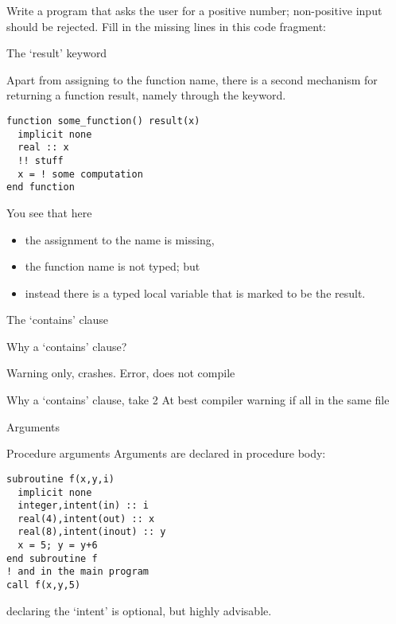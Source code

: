 \begin{exercise}
  \label{ex:freadpos}
  Write a program that asks the user for a positive number;
  non-positive
  input should be rejected.  Fill in the missing lines in this code
  fragment:
\end{exercise}

 {The `result' keyword}
\label{sec:fresult}

Apart from assigning to the function name,
there is a second mechanism for returning a function result,
namely through the  keyword.
%
\begin{lstlisting}
function some_function() result(x)
  implicit none
  real :: x
  !! stuff
  x = ! some computation
end function
\end{lstlisting}

You see that here
\begin{itemize}
\item the assignment to the name is missing,
\item the function name is not typed; but
\item instead there is a typed local variable that is marked to be the result.
\end{itemize}

 {The `contains' clause}

\begin{block}{Why a `contains' clause?}
  \label{sl:whycontain}
  \begin{multicols}{2}
    Warning only, crashes.
    \vfill\columnbreak
    Error, does not compile
  \end{multicols}
\end{block}

\begin{block}{Why a `contains' clause, take 2}
  \label{sl:whycontain_type}
  At best compiler warning if all in the same file\\
\end{block}

 {Arguments}

\begin{block}{Procedure arguments}
  \label{sl:farguments}
 Arguments are declared in procedure body:
\begin{lstlisting}
subroutine f(x,y,i)
  implicit none
  integer,intent(in) :: i
  real(4),intent(out) :: x
  real(8),intent(inout) :: y
  x = 5; y = y+6
end subroutine f
! and in the main program
call f(x,y,5)
\end{lstlisting}
declaring the `intent' is optional, but highly advisable.
\end{block}

